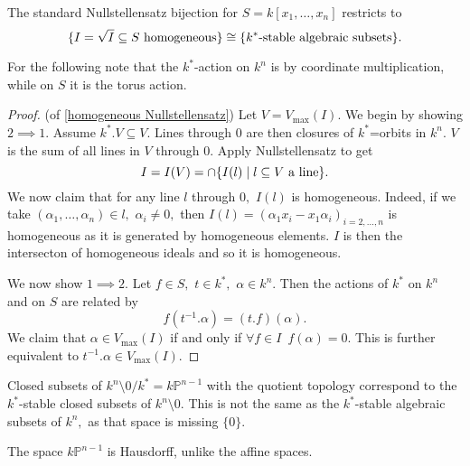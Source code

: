 \begin{corollary}
  The standard Nullstellensatz bijection for \(S = k[x_1, \dotsc, x_n]\) restricts to
  \[\{I = \sqrt{I} \subseteq S \text{ homogeneous}\} \cong \{k^*\text{-stable algebraic subsets}\}.\]
\end{corollary}


For the following note that the \(k^*\)-action on \(k^n\) is by coordinate multiplication, while on \(S\) it is the torus action.

\begin{proof}(of \cref{homogeneous Nullstellensatz})
  Let \(V = V_{\text{max}}(I).\) We begin by showing \(2 \implies 1.\) Assume \(k^*. V \subseteq V.\) Lines through \(0\) are then closures of \(k^*\)=orbits in \(k^n.\) \(V\) is the sum of all lines in \(V\) through \(0.\) Apply Nullstellensatz to get
  \[I = I(V) = \cap \{I(l) \mathrel{|} l \subseteq V \text{ a line}\}.\]
  We now claim that for any line \(l\) through \(0,\) \(I(l)\) is homogeneous. Indeed, if we take \((\alpha_1, \dotsc, \alpha_n) \in l,\) \(\alpha_i \neq 0,\) then
  \(I(l) = (\alpha_1 x_i - x_1 \alpha_i)_{i = 2, \dotsc, n}\)
  is homogeneous as it is generated by homogeneous elements.
  \(I\) is then the intersecton of homogeneous ideals and so it is homogeneous.

  We now show \(1 \implies 2.\) Let \(f \in S,\) \(t \in k^*,\) \(\alpha \in k^n\). Then the actions of \(k^*\) on \(k^n\) and on \(S\) are related by
  \[f(t^{-1}.\alpha) = (t.f)(\alpha).\]
  We claim that \(\alpha \in V_{\text{max}}(I)\) if and only if \(\forall f \in I \enspace f(\alpha) = 0.\)
  This is further equivalent to
  \(t^{-1}.\alpha \in V_{\text{max}}(I).\)
\end{proof}

\begin{note}
  Closed subsets of \(k^n \setminus 0 /{k^*} = k \mathbb P^{n-1}\) with the quotient topology correspond to the \(k^*\)-stable closed subsets of \(k^n \setminus 0.\) This is not the same as the \(k^*\)-stable algebraic subsets of \(k^n,\) as that space is missing \(\{0\}.\)

  The space \(k \mathbb P^{n-1}\) is Hausdorff, unlike the affine spaces.
\end{note}

















